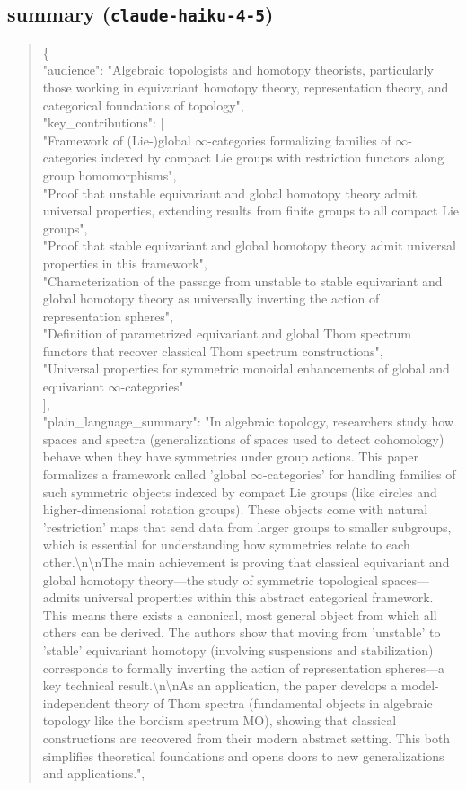 \documentclass[11pt]{article}
\begin{document}
\subsection*{summary (\texttt{claude-haiku-4-5})}
\begin{quote}\small\ttfamily\raggedright
\{\\
  "audience": "Algebraic topologists and homotopy theorists, particularly those working in equivariant homotopy theory, representation theory, and categorical foundations of topology",\\
  "key\_contributions": [\\
    "Framework of (Lie-)global \ensuremath{\infty}-categories formalizing families of \ensuremath{\infty}-categories indexed by compact Lie groups with restriction functors along group homomorphisms",\\
    "Proof that unstable equivariant and global homotopy theory admit universal properties, extending results from finite groups to all compact Lie groups",\\
    "Proof that stable equivariant and global homotopy theory admit universal properties in this framework",\\
    "Characterization of the passage from unstable to stable equivariant and global homotopy theory as universally inverting the action of representation spheres",\\
    "Definition of parametrized equivariant and global Thom spectrum functors that recover classical Thom spectrum constructions",\\
    "Universal properties for symmetric monoidal enhancements of global and equivariant \ensuremath{\infty}-categories"\\
  ],\\
  "plain\_language\_summary": "In algebraic topology, researchers study how spaces and spectra (generalizations of spaces used to detect cohomology) behave when they have symmetries under group actions. This paper formalizes a framework called 'global \ensuremath{\infty}-categories' for handling families of such symmetric objects indexed by compact Lie groups (like circles and higher-dimensional rotation groups). These objects come with natural 'restriction' maps that send data from larger groups to smaller subgroups, which is essential for understanding how symmetries relate to each other.\textbackslash{}n\textbackslash{}nThe main achievement is proving that classical equivariant and global homotopy theory---the study of symmetric topological spaces---admits universal properties within this abstract categorical framework. This means there exists a canonical, most general object from which all others can be derived. The authors show that moving from 'unstable' to 'stable' equivariant homotopy (involving suspensions and stabilization) corresponds to formally inverting the action of representation spheres---a key technical result.\textbackslash{}n\textbackslash{}nAs an application, the paper develops a model-independent theory of Thom spectra (fundamental objects in algebraic topology like the bordism spectrum MO), showing that classical constructions are recovered from their modern abstract setting. This both simplifies theoretical foundations and opens doors to new generalizations and applications.",\\

\end{quote}
\end{document}
